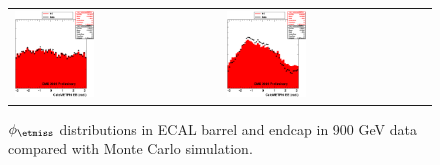 \begin{figure}[h!]
 \centering
 \begin{tabular}{ll}
  \includegraphics[width=0.40\textwidth]{plots_DataVsMC_MB_900GeV/my_calometEBPhi.eps} &
  \includegraphics[width=0.40\textwidth]{plots_DataVsMC_MB_900GeV/my_calometEEPhi.eps} \\
 \end{tabular}
 \caption{$\phi_{\etmiss}$ distributions in ECAL barrel and endcap in 900 GeV data compared
   with Monte Carlo simulation.
          \label{fig:DataVsMC_MB_900_8}}
\end{figure}

